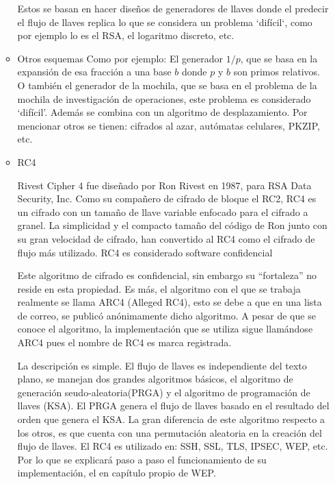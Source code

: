 \begin{itemize}
\begin{itemize}
			Estos se basan en hacer diseños de generadores de llaves donde el predecir el flujo de llaves replica lo que se considera un problema `difícil`, como por ejemplo lo es el RSA, el logaritmo discreto, etc.
			\item Otros esquemas
			Como por ejemplo: 
			El generador $1/p$, que se basa en la expansión de esa fracción a una base $b$ donde $p$ y $b$ son primos relativos. O también el generador de la mochila, que se basa en el problema de la mochila de investigación de operaciones, este problema es considerado `difícil'. Además  se combina con un algoritmo de desplazamiento.
			Por mencionar otros se tienen: cifrados al azar, autómatas celulares, PKZIP, etc.
			\item RC4
			
			Rivest Cipher 4 fue diseñado por Ron Rivest en 1987, para RSA Data Security, Inc. Como su compañero de cifrado de bloque el RC2, RC4 es un cifrado con un tamaño de llave variable enfocado para el cifrado a granel. La simplicidad y el compacto tamaño del código de Ron junto con su gran velocidad de cifrado, han convertido al RC4 como el cifrado de flujo más utilizado. 
			RC4 es considerado software confidencial
			
			Este algoritmo de cifrado es confidencial, sin embargo su ``fortaleza'' no reside en esta propiedad. Es más, el algoritmo con el que se trabaja realmente se llama ARC4 (Alleged RC4), esto se debe a que en una lista de correo, se publicó anónimamente dicho algoritmo. A pesar de que se conoce el algoritmo, la implementación que se utiliza sigue llamándose ARC4 pues el nombre de RC4 es marca registrada. 
			
			La descripción es simple. El flujo de llaves es independiente del texto plano, se manejan dos grandes algoritmos básicos, el algoritmo de generación seudo-aleatoria(PRGA)  y el algoritmo de programación de llaves (KSA).  El PRGA genera el flujo de llaves basado en el resultado del orden que genera el KSA.
			La gran diferencia de este algoritmo respecto a los otros, es que cuenta con una permutación aleatoria en la creación del flujo de llaves.
			El RC4 es utilizado en: SSH, SSL, TLS, IPSEC, WEP, etc. Por lo que se explicará paso a paso el funcionamiento de  su implementación, el en capítulo propio de WEP.
		\end{itemize}
	

\end{itemize}
